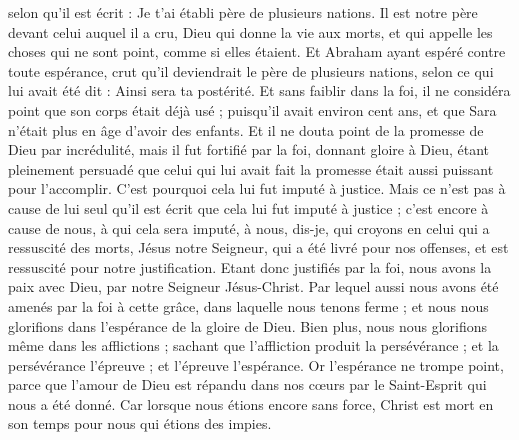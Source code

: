 \begin{multicols}{2}
selon qu'il est écrit : Je t'ai établi père de plusieurs nations. Il est notre père devant celui auquel il a cru, Dieu qui donne la vie aux morts, et qui appelle les choses qui ne sont point, comme si elles étaient.
Et Abraham ayant espéré contre toute espérance, crut qu'il deviendrait le père de plusieurs nations, selon ce qui lui avait été dit : Ainsi sera ta postérité.
Et sans faiblir dans la foi, il ne considéra point que son corps était déjà usé ; puisqu’il avait environ cent ans, et que Sara n’était plus en âge d'avoir des enfants.
Et il ne douta point de la promesse de Dieu par incrédulité, mais il fut fortifié par la foi, donnant gloire à Dieu,
étant pleinement persuadé que celui qui lui avait fait la promesse était aussi puissant pour l'accomplir.
C'est pourquoi cela lui fut imputé à justice.
Mais ce n’est pas à cause de lui seul qu’il est écrit que cela lui fut imputé à justice ;
c’est encore à cause de nous, à qui cela sera imputé, à nous, dis-je, qui croyons en celui qui a ressuscité des morts, Jésus notre Seigneur,
qui a été livré pour nos offenses, et est ressuscité pour notre justification.
\VerseOne{}Etant donc justifiés par la foi, nous avons la paix avec Dieu, par notre Seigneur Jésus-Christ.
Par lequel aussi nous avons été amenés par la foi à cette grâce, dans laquelle nous tenons ferme ; et nous nous glorifions dans l'espérance de la gloire de Dieu.
Bien plus, nous nous glorifions même dans les afflictions ; sachant que l'affliction produit la persévérance ;
et la persévérance l'épreuve ; et l'épreuve l'espérance.
Or l'espérance ne trompe point, parce que l'amour de Dieu est répandu dans nos cœurs par le Saint-Esprit qui nous a été donné.
Car lorsque nous étions encore sans force, Christ est mort en son temps pour nous qui étions des impies.

\end{multicols}

